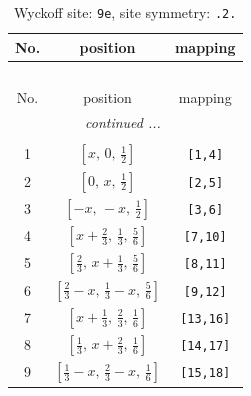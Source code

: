 \documentclass[fleqn,8pt]{jsarticle}
\begin{document}
\begin{longtable}{ccc}
\caption{Wyckoff site: {\tt 9e}, site symmetry: {\tt .2.}}
 \\
 \hline \hline
No. & position & mapping \\ \hline \endfirsthead

\multicolumn{2}{l}{\tablename\ \thetable{}} \\
 \hline \hline
No. & position & mapping \\ \hline \endhead

 \hline \hline
\multicolumn{2}{r}{\footnotesize\it continued ...} \\ \endfoot

 \hline \hline
\multicolumn{2}{r}{} \\ \endlastfoot

1 & $\left[ x,\, 0,\, \frac{1}{2} \right]$ & {\tt [1,4]} \\ \hline
2 & $\left[ 0,\, x,\, \frac{1}{2} \right]$ & {\tt [2,5]} \\ \hline
3 & $\left[ - x,\, - x,\, \frac{1}{2} \right]$ & {\tt [3,6]} \\ \hline
4 & $\left[ x + \frac{2}{3},\, \frac{1}{3},\, \frac{5}{6} \right]$ & {\tt [7,10]} \\ \hline
5 & $\left[ \frac{2}{3},\, x + \frac{1}{3},\, \frac{5}{6} \right]$ & {\tt [8,11]} \\ \hline
6 & $\left[ \frac{2}{3} - x,\, \frac{1}{3} - x,\, \frac{5}{6} \right]$ & {\tt [9,12]} \\ \hline
7 & $\left[ x + \frac{1}{3},\, \frac{2}{3},\, \frac{1}{6} \right]$ & {\tt [13,16]} \\ \hline
8 & $\left[ \frac{1}{3},\, x + \frac{2}{3},\, \frac{1}{6} \right]$ & {\tt [14,17]} \\ \hline
9 & $\left[ \frac{1}{3} - x,\, \frac{2}{3} - x,\, \frac{1}{6} \right]$ & {\tt [15,18]} \\
\end{longtable}
\renewcommand{\arraystretch}{1.2}
\end{document}
